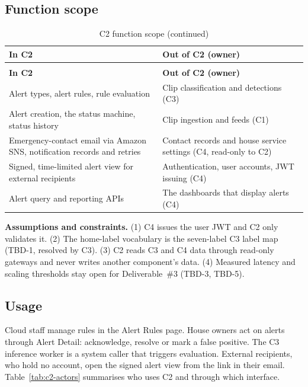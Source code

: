 \subsection{Function scope}
\begin{longtable}{L{6.4cm}L{8.4cm}}
\caption{C2 function scope}\label{tab:c2-scope}\\
\toprule
\textbf{In C2} & \textbf{Out of C2 (owner)} \\
\midrule
\endfirsthead
\caption[]{C2 function scope (continued)}\\
\toprule
\textbf{In C2} & \textbf{Out of C2 (owner)} \\
\midrule
\endhead
Alert types, alert rules, rule evaluation & Clip classification and detections (C3) \\
Alert creation, the status machine, status history & Clip ingestion and feeds (C1) \\
Emergency-contact email via Amazon SNS, notification records and retries & Contact records and house service settings (C4, read-only to C2) \\
Signed, time-limited alert view for external recipients & Authentication, user accounts, JWT issuing (C4) \\
Alert query and reporting APIs & The dashboards that display alerts (C4) \\
\bottomrule
\end{longtable}

\textbf{Assumptions and constraints.} (1) C4 issues the user JWT and C2 only validates it. (2) The
home-label vocabulary is the seven-label C3 label map (TBD-1, resolved by C3). (3) C2 reads C3 and C4
data through read-only gateways and never writes another component's data. (4) Measured latency and
scaling thresholds stay open for Deliverable~\#3 (TBD-3, TBD-5).

\subsection{Usage}
Cloud staff manage rules in the Alert Rules page. House owners act on alerts through Alert Detail:
acknowledge, resolve or mark a false positive. The C3 inference worker is a system caller that
triggers evaluation. External recipients, who hold no account, open the signed alert view from the
link in their email. Table~\ref{tab:c2-actors} summarises who uses C2 and through which interface.

